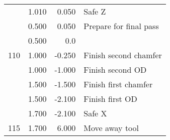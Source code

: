\documentclass{article}
\begin{document}
\begin{figure}[H]
\begin{tabular}{rrrl}
	& 1.010 & 0.050 & Safe Z \\
	& 0.500 & 0.050 & Prepare for final pass \\
	& 0.500 & 0.0 & \\
	110 & 1.000 & -0.250 & Finish second chamfer \\
	& 1.000 & -1.000 & Finish second OD \\
	& 1.500 & -1.500 & Finish first chamfer \\
	& 1.500 & -2.100 & Finish first OD \\
	& 1.700 & -2.100 & Safe X \\
	115 & 1.700 & 6.000 & Move away tool \\
	\bottomrule
\end{tabular}
\end{figure}
\end{document}
